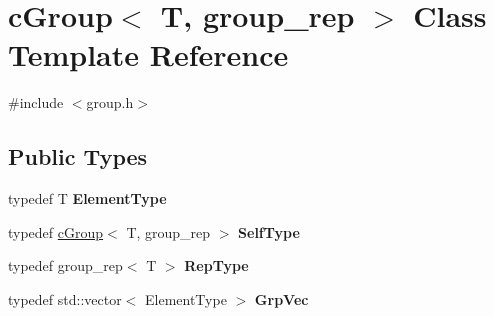 \hypertarget{classcGroup}{\section{c\-Group$<$ \-T, group\-\_\-rep $>$ \-Class \-Template \-Reference}
\label{classcGroup}
}


{\ttfamily \#include $<$group.\-h$>$}

\subsection*{\-Public \-Types}
\begin{DoxyCompactItemize}
\item 
\hypertarget{classcGroup_abf5ed8f308bc05dbbb75b1f2ccb3bf18}{typedef \-T {\bfseries \-Element\-Type}}\label{classcGroup_abf5ed8f308bc05dbbb75b1f2ccb3bf18}

\item 
\hypertarget{classcGroup_a8c16d6d9eb0d68d286505528c1e94d3a}{typedef \hyperlink{classcGroup}{c\-Group}$<$ \-T, group\-\_\-rep $>$ {\bfseries \-Self\-Type}}\label{classcGroup_a8c16d6d9eb0d68d286505528c1e94d3a}

\item 
\hypertarget{classcGroup_a8752843a8e5c6d23411de90d4e1a1f51}{typedef group\-\_\-rep$<$ \-T $>$ {\bfseries \-Rep\-Type}}\label{classcGroup_a8752843a8e5c6d23411de90d4e1a1f51}

\item 
\hypertarget{classcGroup_aa233178cfb06c6c59df798ff40fce156}{typedef std\-::vector$<$ \-Element\-Type $>$ {\bfseries \-Grp\-Vec}}\label{classcGroup_aa233178cfb06c6c59df798ff40fce156}

\end{DoxyCompactItemize}
